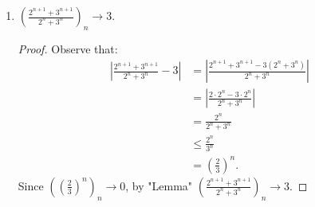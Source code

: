\documentclass[10pt,twoside,openany]{memoir}
\begin{document}
\begin{exercise}
\begin{enumerate}[label = (\arabic*)]
\begin{proof}
\begin{equation*}
\begin{split}
                                \left|\frac{(n+1)^k b^{n+1}}{n^k b^n} - b\right| 
                                &= \left|\frac{\left((n+1)^k - n^k\right)b}{n^k}\right| \\
                                &= b \cdot \frac{(n+1)^k - n^k}{n^k} \\
                                &= b \left( \left(\frac{n+1}{n}\right)^k - 1\right) \\
                                &= b \left(\left(1 + \frac{1}{n}\right)^k - 1\right).
                            \end{split}
                            \end{equation*}
                        Since $(\frac{1}{n})_n \rightarrow 0$, $\epsilon_n = \left(\left(1 + \frac{1}{n}\right)^k - 1\right)_n \rightarrow 0$. Thus by "Lemma", $\left(\left|\frac{(n+1)^k b^{n+1}}{n^k b^n}\right|\right)_n \rightarrow b$. Since $0 \leq b < 1$, by the ratio test $(n^k b^n)_n \rightarrow 0$.
                    \end{proof}
                \item $\left(\frac{2^{n+1}+3^{n+1}}{2^n + 3^n}\right)_n \rightarrow 3$.
                    \begin{proof}
                        Observe that:
                            \begin{equation*}
                            \begin{split}
                                \left|\frac{2^{n+1} +3^{n+1}}{2^n + 3^n} - 3\right| 
                                & = \left|\frac{2^{n+1} + 3^{n+1} - 3(2^n + 3^n)}{2^n + 3^n}\right| \\
                                & = \left|\frac{2 \cdot 2^n - 3 \cdot 2^n}{2^n + 3^n}\right| \\
                                & = \frac{2^n}{2^n + 3^n} \\
                                & \leq \frac{2^n}{3^n} \\
                                & = \left(\frac{2}{3}\right)^n.
                            \end{split}
                            \end{equation*}
                        Since $\left(\left(\frac{2}{3}\right)^n\right)_n \rightarrow 0$, by "Lemma" $\left(\frac{2^{n+1}+3^{n+1}}{2^n + 3^n}\right)_n \rightarrow 3$.
                    \end{proof}
            \end{enumerate}
    \end{exercise}
\end{document}
